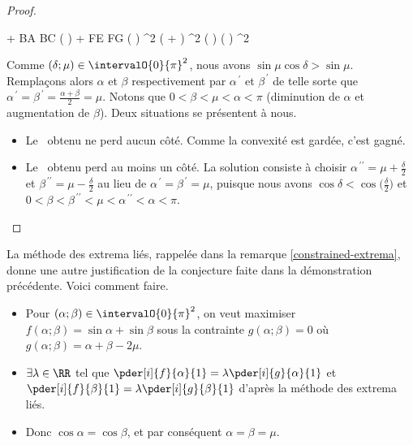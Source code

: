 \begin{proof}
	\medskip
	\begin{stepcalc}[style=ar*]
		 + 
		 BA \cdot BC \cdot \sin \big(  \big)
		+
		 FE \cdot FG \cdot \sin \big(  \big)
	\explnext{}
		 \ell^2 ( \sin \alpha + \sin \beta )
		 \ell^2 \sin \big(  \big) \cos \big(  \big)
	\explnext{}
		 \ell^2 \sin \mu \cos \delta
	\end{stepcalc}


	\medskip

	Comme $(\delta ; \mu) \in \intervalO{0}{\pi}^2$,
	nous avons $\sin \mu \cos \delta > \sin \mu$.
	Remplaçons alors $\alpha$ et $\beta$ respectivement par $\alpha^{\,\prime}$ et $\beta^{\,\prime}$ de telle sorte que $\alpha^{\,\prime} = \beta^{\,\prime} = \frac{\alpha + \beta}{2} = \mu$.
	Notons que
	$0 < \beta < \mu < \alpha < \pi$
	(diminution de $\alpha$ et augmentation de $\beta$).
	Deux situations se présentent à nous.
	\begin{itemize}
		\item Le \ngone\ obtenu ne perd aucun côté.
		Comme la convexité est gardée, c'est gagné.

		\item Le \ngone\ obtenu perd au moins un côté. La solution consiste à choisir
		$\alpha^{\,\prime\prime} = \mu + \frac{\delta}{2}$ et $\beta^{\,\prime\prime} = \mu - \frac{\delta}{2}$
		au lieu de
		$\alpha^{\,\prime} = \beta^{\,\prime} = \mu$, puisque nous avons
		$\cos \delta < \cos \big( \frac{\delta}{2} \big)$ et
		$0 < \beta < \beta^{\,\prime\prime} < \mu < \alpha^{\,\prime\prime} < \alpha < \pi$.
	\end{itemize}
\end{proof}




\begin{remark}
	La méthode des extrema liés, rappelée dans la remarque \ref{constrained-extrema}, donne une autre justification de la conjecture faite dans la démonstration précédente. Voici comment faire.
	\begin{itemize}
		\item Pour $(\alpha ; \beta) \in \intervalO{0}{\pi}^2$, on veut maximiser $f(\alpha ; \beta) =  \sin \alpha + \sin \beta$ sous la contrainte $g(\alpha ; \beta) = 0$ où $g(\alpha ; \beta) = \alpha + \beta - 2 \mu$.

		\item
    	$\exists \lambda \in \RR$ tel que
    	$\pder[i]{f}{\alpha}{1} = \lambda \pder[i]{g}{\alpha}{1}$ et
    	$\pder[i]{f}{\beta}{1} = \lambda \pder[i]{g}{\beta}{1}$
		d'après la méthode des extrema liés.

		\item Donc
		$\cos \alpha = \cos \beta$,
		et par conséquent
		$\alpha = \beta = \mu$.
	\end{itemize}
\end{remark}


